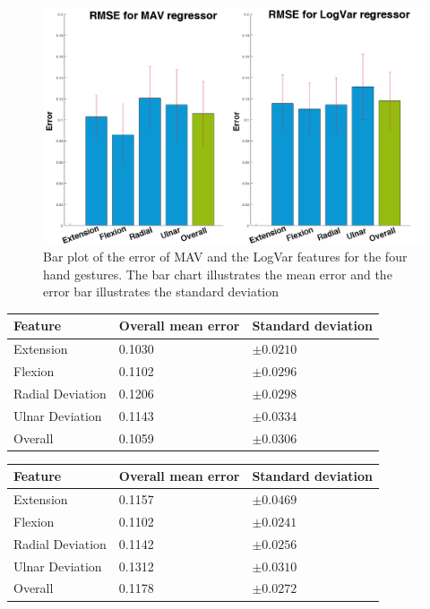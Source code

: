 \begin{figure}[H]
	\includegraphics[width=1\textwidth]{figures/results/gimmeThemRMSEBars}  %
	\caption{Bar plot of the error of MAV and the LogVar features for the four hand gestures. The bar chart illustrates the mean error and the error bar illustrates the standard deviation}
	\label{fig:gimmeThemRMSEBars}  %
\end{figure}

	\begin{center}
		\begin{tabular}{l l l}
			\toprule
			\textbf{Feature} & \textbf{Overall mean error} & \textbf{Standard deviation}\\
			\midrule
			Extension & 0.1030 & $\pm 0.0210$ \\
			Flexion & 0.1102 & $\pm 0.0296$ \\
			Radial Deviation & 0.1206 & $\pm 0.0298$ \\
			Ulnar Deviation & 0.1143 & $\pm 0.0334$ \\
			Overall & 0.1059 & $\pm 0.0306$ \\
			\bottomrule
		\end{tabular}
	\end{center}
	
	\begin{center}
		\begin{tabular}{l l l}
			\toprule
			\textbf{Feature} & \textbf{Overall mean error} & \textbf{Standard deviation}\\
			\midrule
			Extension & 0.1157 & $\pm 0.0469$ \\
			Flexion & 0.1102 & $\pm 0.0241$ \\
			Radial Deviation & 0.1142 & $\pm 0.0256$ \\
			Ulnar Deviation & 0.1312 & $\pm 0.0310$ \\
			Overall & 0.1178 & $\pm 0.0272$ \\
			\bottomrule
		\end{tabular}
	\end{center}


